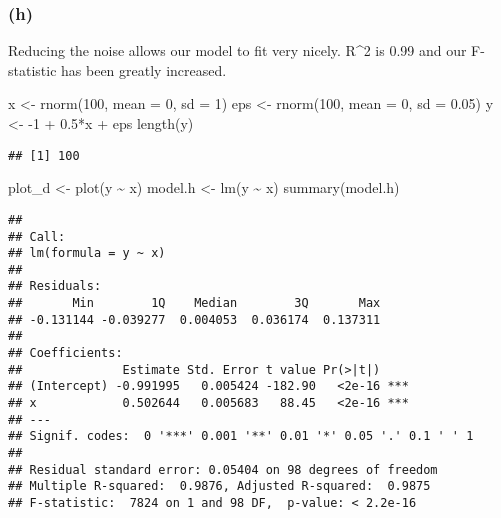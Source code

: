 \documentclass[
]{article}
\newenvironment{Shaded}{\begin{snugshade}}{\end{snugshade}}
\newcommand{\AttributeTok}[1]{\textcolor[rgb]{0.77,0.63,0.00}{#1}}
\newcommand{\DecValTok}[1]{\textcolor[rgb]{0.00,0.00,0.81}{#1}}
\newcommand{\FloatTok}[1]{\textcolor[rgb]{0.00,0.00,0.81}{#1}}
\newcommand{\FunctionTok}[1]{\textcolor[rgb]{0.00,0.00,0.00}{#1}}
\newcommand{\NormalTok}[1]{#1}
\newcommand{\OtherTok}[1]{\textcolor[rgb]{0.56,0.35,0.01}{#1}}
\newcommand{\SpecialCharTok}[1]{\textcolor[rgb]{0.00,0.00,0.00}{#1}}
\begin{document}
\hypertarget{h-1}{%
\subsubsection{(h)}\label{h-1}}

Reducing the noise allows our model to fit very nicely. R\^{}2 is 0.99
and our F-statistic has been greatly increased.

\begin{Shaded}
\begin{Highlighting}[]
\NormalTok{x }\OtherTok{\textless{}{-}} \FunctionTok{rnorm}\NormalTok{(}\DecValTok{100}\NormalTok{, }\AttributeTok{mean =} \DecValTok{0}\NormalTok{, }\AttributeTok{sd =} \DecValTok{1}\NormalTok{)}
\NormalTok{eps }\OtherTok{\textless{}{-}} \FunctionTok{rnorm}\NormalTok{(}\DecValTok{100}\NormalTok{, }\AttributeTok{mean =} \DecValTok{0}\NormalTok{, }\AttributeTok{sd =} \FloatTok{0.05}\NormalTok{)}
\NormalTok{y }\OtherTok{\textless{}{-}} \SpecialCharTok{{-}}\DecValTok{1} \SpecialCharTok{+} \FloatTok{0.5}\SpecialCharTok{*}\NormalTok{x }\SpecialCharTok{+}\NormalTok{ eps}
\FunctionTok{length}\NormalTok{(y)}
\end{Highlighting}
\end{Shaded}

\begin{verbatim}
## [1] 100
\end{verbatim}

\begin{Shaded}
\begin{Highlighting}[]
\NormalTok{plot\_d }\OtherTok{\textless{}{-}} \FunctionTok{plot}\NormalTok{(y }\SpecialCharTok{\textasciitilde{}}\NormalTok{ x)}
\NormalTok{model.h }\OtherTok{\textless{}{-}} \FunctionTok{lm}\NormalTok{(y }\SpecialCharTok{\textasciitilde{}}\NormalTok{ x)}
\FunctionTok{summary}\NormalTok{(model.h)}
\end{Highlighting}
\end{Shaded}

\begin{verbatim}
## 
## Call:
## lm(formula = y ~ x)
## 
## Residuals:
##       Min        1Q    Median        3Q       Max 
## -0.131144 -0.039277  0.004053  0.036174  0.137311 
## 
## Coefficients:
##              Estimate Std. Error t value Pr(>|t|)    
## (Intercept) -0.991995   0.005424 -182.90   <2e-16 ***
## x            0.502644   0.005683   88.45   <2e-16 ***
## ---
## Signif. codes:  0 '***' 0.001 '**' 0.01 '*' 0.05 '.' 0.1 ' ' 1
## 
## Residual standard error: 0.05404 on 98 degrees of freedom
## Multiple R-squared:  0.9876, Adjusted R-squared:  0.9875 
## F-statistic:  7824 on 1 and 98 DF,  p-value: < 2.2e-16
\end{verbatim}
\end{document}

